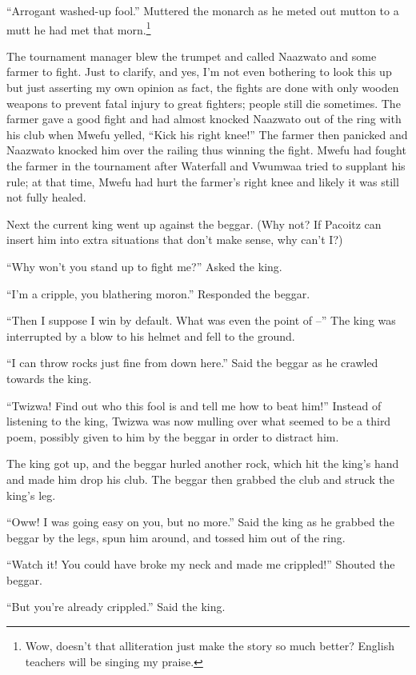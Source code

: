 ``Arrogant washed-up fool.'' Muttered the monarch as he meted out mutton to a mutt he had met that morn.\footnote{Wow, doesn't that alliteration just make the story so much better? English teachers will be singing my praise.}

\tbreak

The tournament manager blew the trumpet and called Naazwato and some farmer to fight. Just to clarify, and yes, I'm not even bothering to look this up but just asserting my own opinion as fact, the fights are done with only wooden weapons to prevent fatal injury to great fighters; people still die sometimes. The farmer gave a good fight and had almost knocked Naazwato out of the ring with his club when Mwefu yelled, ``Kick his right knee!'' The farmer then panicked and Naazwato knocked him over the railing thus winning the fight. Mwefu had fought the farmer in the tournament after Waterfall and Vwumwaa tried to supplant his rule; at that time, Mwefu had hurt the farmer's right knee and likely it was still not fully healed. 

Next the current king went up against the beggar. (Why not? If Pacoitz can insert him into extra situations that don't make sense, why can't I?)

``Why won't you stand up to fight me?'' Asked the king.

``I'm a cripple, you blathering moron.'' Responded the beggar.

``Then I suppose I win by default. What was even the point of --'' The king was interrupted by a blow to his helmet and fell to the ground.

``I can throw rocks just fine from down here.'' Said the beggar as he crawled towards the king.

``Twizwa! Find out who this fool is and tell me how to beat him!'' Instead of listening to the king, Twizwa was now mulling over what seemed to be a third poem, possibly given to him by the beggar in order to distract him.

The king got up, and the beggar hurled another rock, which hit the king's hand and made him drop his club. The beggar then grabbed the club and struck the king's leg.

``Oww! I was going easy on you, but no more.'' Said the king as he grabbed the beggar by the legs, spun him around, and tossed him out of the ring.

``Watch it! You could have broke my neck and made me crippled!'' Shouted the beggar.

``But you're already crippled.'' Said the king.


